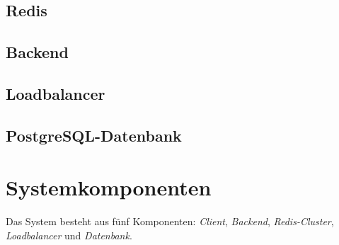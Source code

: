 \subsection{Redis}
\subsection{Backend}
\subsection{Loadbalancer}
\subsection{PostgreSQL-Datenbank}


\section{Systemkomponenten}
Das System besteht aus fünf Komponenten: \textit{Client}, \textit{Backend}, \textit{Redis-Cluster}, \textit{Loadbalancer} und \textit{Datenbank}.

